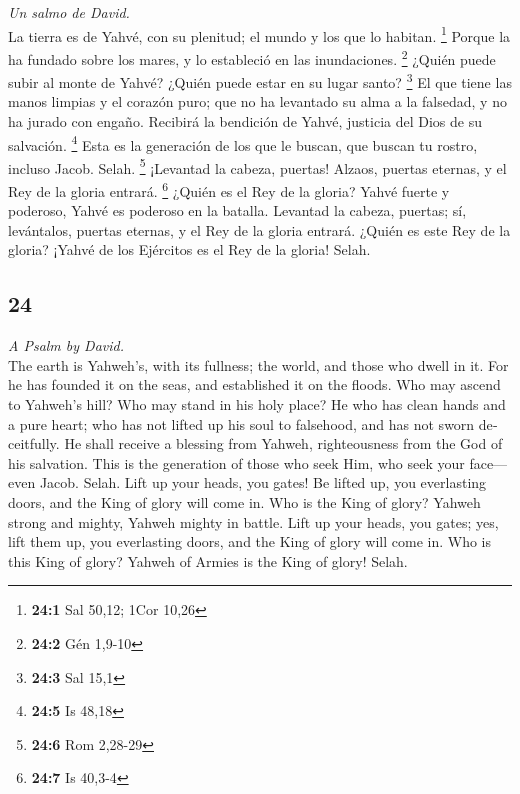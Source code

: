 \begin{paracol}{2}
\emph{Un salmo de David.}\\
 La tierra es de Yahvé, con su plenitud; el mundo y los
que lo habitan. \footnote{\textbf{24:1} Sal 50,12; 1Cor 10,26}
 Porque la ha fundado sobre los mares, y lo estableció en
las inundaciones. \footnote{\textbf{24:2} Gén 1,9-10} 
¿Quién puede subir al monte de Yahvé? ¿Quién puede estar en su lugar
santo? \footnote{\textbf{24:3} Sal 15,1}  El que tiene las
manos limpias y el corazón puro; que no ha levantado su alma a la
falsedad, y no ha jurado con engaño.  Recibirá la
bendición de Yahvé, justicia del Dios de su salvación. \footnote{\textbf{24:5}
  Is 48,18}  Esta es la generación de los que le buscan,
que buscan tu rostro, incluso Jacob. Selah. \footnote{\textbf{24:6} Rom
  2,28-29}  ¡Levantad la cabeza, puertas! Alzaos, puertas
eternas, y el Rey de la gloria entrará. \footnote{\textbf{24:7} Is
  40,3-4}  ¿Quién es el Rey de la gloria? Yahvé fuerte y
poderoso, Yahvé es poderoso en la batalla.  Levantad la
cabeza, puertas; sí, levántalos, puertas eternas, y el Rey de la gloria
entrará.  ¿Quién es este Rey de la gloria? ¡Yahvé de los
Ejércitos es el Rey de la gloria! Selah.

\switchcolumn
\begin{otherlanguage}{english}

\hypertarget{section-47}{%
\section{24}\label{section-47}}

\emph{A Psalm by David.}\\
 The earth is Yahweh's, with its fullness; the world, and
those who dwell in it.  For he has founded it on the seas,
and established it on the floods.  Who may ascend to
Yahweh's hill? Who may stand in his holy place?  He who
has clean hands and a pure heart; who has not lifted up his soul to
falsehood, and has not sworn deceitfully.  He shall
receive a blessing from Yahweh, righteousness from the God of his
salvation.  This is the generation of those who seek Him,
who seek your face---even Jacob. Selah.  Lift up your
heads, you gates! Be lifted up, you everlasting doors, and the King of
glory will come in.  Who is the King of glory? Yahweh
strong and mighty, Yahweh mighty in battle.  Lift up your
heads, you gates; yes, lift them up, you everlasting doors, and the King
of glory will come in.  Who is this King of glory? Yahweh
of Armies is the King of glory! Selah.


\end{otherlanguage}
\end{paracol}
